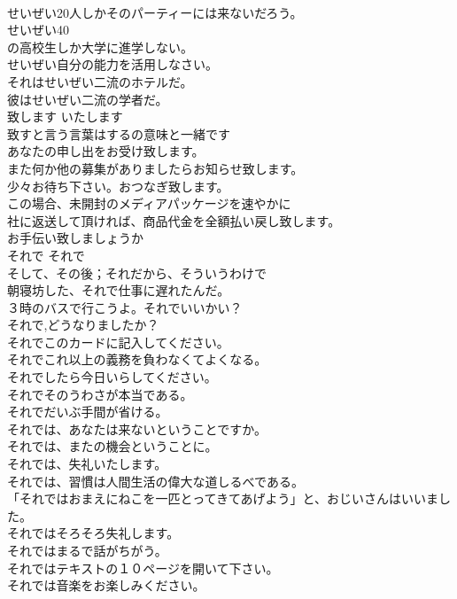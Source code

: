 \documentclass[8pt]{extreport}
\begin{document}
\begin{CJK}{UTF8}{min}
\\	せいぜい20人しかそのパーティーには来ないだろう。  
\\	せいぜい40
\\	の高校生しか大学に進学しない。  
\\	せいぜい自分の能力を活用しなさい。  
\\	それはせいぜい二流のホテルだ。  
\\	彼はせいぜい二流の学者だ。  
\\	致します	いたします	
\\	致すと言う言葉はするの意味と一緒です	
\\	あなたの申し出をお受け致します。  
\\	また何か他の募集がありましたらお知らせ致します。  
\\	少々お待ち下さい。おつなぎ致します。  
\\	この場合、未開封のメディアパッケージを速やかに
\\	社に返送して頂ければ、商品代金を全額払い戻し致します。  
\\	お手伝い致しましょうか  
\\	それで	それで	
\\	そして、その後；それだから、そういうわけで	
\\	朝寝坊した、それで仕事に遅れたんだ。  
\\	３時のバスで行こうよ。それでいいかい？  
\\	それで,どうなりましたか？  
\\	それでこのカードに記入してください。   
\\	それでこれ以上の義務を負わなくてよくなる。   
\\	それでしたら今日いらしてください。   
\\	それでそのうわさが本当である。   
\\	それでだいぶ手間が省ける。   
\\	それでは、あなたは来ないということですか。   
\\	それでは、またの機会ということに。   
\\	それでは、失礼いたします。   
\\	それでは、習慣は人間生活の偉大な道しるべである。   
\\	「それではおまえにねこを一匹とってきてあげよう」と、おじいさんはいいました。   
\\	それではそろそろ失礼します。   
\\	それではまるで話がちがう。   
\\	それではテキストの１０ページを開いて下さい。   
\\	それでは音楽をお楽しみください。   

\end{CJK}
\end{document}
